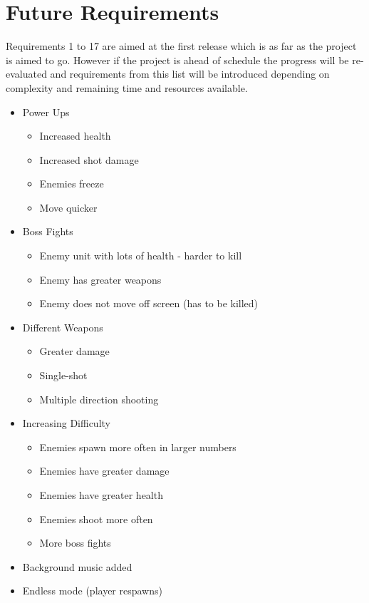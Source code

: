 \section{Future Requirements}
\label{sec: future_requirements}
Requirements 1 to 17 are aimed at the first release which is as far as the project is aimed to go. However if the project is ahead of schedule the progress will be re-evaluated and requirements from this list will be introduced depending on complexity and remaining time and resources available.
\begin{itemize}
\item Power Ups
	\begin{itemize}
	\item Increased health
	\item Increased shot damage
	\item Enemies freeze
	\item Move quicker
	\end{itemize}
\item Boss Fights
	\begin{itemize}
	\item Enemy unit with lots of health - harder to kill
	\item Enemy has greater weapons
	\item Enemy does not move off screen (has to be killed)
	\end{itemize}
\item Different Weapons
	\begin{itemize}
	\item Greater damage
	\item Single-shot
	\item Multiple direction shooting
	\end{itemize}
\item Increasing Difficulty
	\begin{itemize}
	\item Enemies spawn more often in larger numbers
	\item Enemies have greater damage
	\item Enemies have greater health
	\item Enemies shoot more often
	\item More boss fights
	\end{itemize}
\item Background music added
\item Endless mode (player respawns)
\end{itemize}